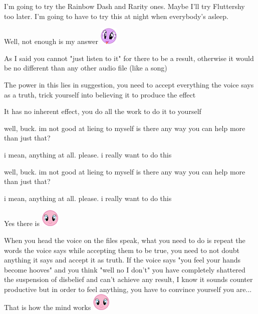 \documentclass[ebook,12pt,oneside,openany]{memoir}
\newcommand{\mytexttilde}{\raisebox{0.5ex}{\texttildelow}}
\begin{document}
\begin{tcolorbox}[title=Le Kvlt Dawn]
\par{I'm going to try the Rainbow Dash and Rarity ones. Maybe I'll try Fluttershy too later. I'm going to have to try this at night when everybody's asleep. }
\end{tcolorbox}
\begin{tcolorbox}[title=Toby]
\begin{tcolorbox}[title=\mytexttilde{}Lawful Sturdy Wing\mytexttilde{}]
\par{Well, not enough is my answer \includegraphics{images/mlp_eW9KEfP.png}}
\par{As I said you cannot "just listen to it" for there to be a result, otherwise it would be no different than any other audio file (like a song) }
\par{The power in this lies in suggestion, you need to accept everything the voice says as a truth, trick yourself into believing it to produce the effect}
\par{It has no inherent effect, you do all the work to do it to yourself}
\end{tcolorbox}
\par{well, buck. im not good at lieing to myself is there any way you can help more than just that?}
\par{i mean, anything at all. please. i really want to do this}
\end{tcolorbox}
\begin{tcolorbox}[title=\mytexttilde{}Lawful Sturdy Wing\mytexttilde{},colback=magenta!5!white,colframe=magenta!75!black,coltitle=white]
\begin{tcolorbox}[title=Toby]
\par{well, buck. im not good at lieing to myself is there any way you can help more than just that?}
\par{i mean, anything at all. please. i really want to do this}
\end{tcolorbox}
\par{Yes there is \includegraphics{images/mlp_smile.png} }
\par{When you head the voice on the files speak, what you need to do is repeat the words the voice says while accepting them to be true, you need to not doubt anything it says and accept it as truth. If the voice says "you feel your hands become hooves" and you think "well no I don't" you have completely shattered the suspension of disbelief and can't achieve any result, I know it sounds counter productive but in order to feel anything, you have to convince yourself you are... That is how the mind works \includegraphics{images/mlp_smile.png}}
\end{tcolorbox}
\end{document}
